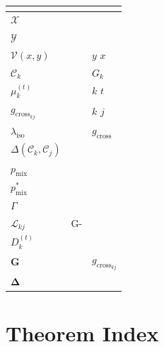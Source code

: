 \documentclass[11pt,a4paper]{article}
\theoremstyle{remark}
\newcommand{\Y}{\mathcal{Y}}
\newcommand{\X}{\mathcal{X}}
\newcommand{\ISOLambda}{\lambda_{\text{iso}}}
\newcommand{\GCoupling}{g_{\text{cross}}}
\newcommand{\CoordSys}{\mathcal{C}}
\newcommand{\InfoPE}{\mathcal{V}}
\begin{document}
\begin{table}[H]
\centering
\begin{tabular}{llp{6cm}}
\toprule
\textbf{} & \textbf{} & \textbf{} \\
\midrule
$\X$ &  &  \\
$\Y$ &  &  \\
$\InfoPE(x,y)$ &  &  $y$  $x$  \\
$\CoordSys_k$ &  &  $G_k$  \\
$\mu_k^{(t)}$ &  &  $k$  $t$  \\
$\GCoupling_{kj}$ &  &  $k$  $j$  \\
$\ISOLambda$ &  & $\GCoupling$  \\
$\Delta(\CoordSys_k, \CoordSys_j)$ &  &  \\
$p_{\text{mix}}$ &  &  \\
$p_{\text{mix}}^*$ &  &  \\
$\Gamma$ &  &  \\
$\mathcal{L}_{kj}$ & G- &  \\
$D_k^{(t)}$ &  &  \\
$\mathbf{G}$ &  &  $\GCoupling_{kj}$ \\
$\mathbf{\Delta}$ &  &  \\
\bottomrule
\end{tabular}
\caption{}
\end{table}

\section{ Theorem Index}
\end{document}
